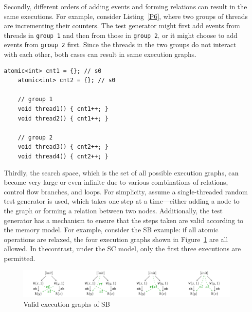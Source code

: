 Secondly, different orders of adding events and forming relations can result in the same executions. For example, consider Listing~\ref{P6}, where two groups of threads are incrementing their counters. The test generator might first add events from threads in \texttt{group 1} and then from those in \texttt{group 2}, or it might choose to add events from \texttt{group 2} first. Since the threads in the two groups do not interact with each other, both cases can result in same execution graphs.


\begin{lstlisting}[caption={P6}, label={P6}]
    atomic<int> cnt1 = {}; // s0
    atomic<int> cnt2 = {}; // s0
    
    // group 1
    void thread1() { cnt1++; }
    void thread2() { cnt1++; }

    // group 2
    void thread3() { cnt2++; }
    void thread4() { cnt2++; }

\end{lstlisting}


Thirdly, the search space, which is the set of all possible execution graphs, can become very large or even infinite due to various combinations of relations, control flow branches, and loops. For simplicity, assume a single-threaded random test generator is used, which takes one step at a time—either adding a node to the graph or forming a relation between two nodes. Additionally, the test generator has a mechanism to ensure that the steps taken are valid according to the memory model. For example, consider the SB example: if all atomic operations are relaxed, the four execution graphs shown in Figure~\ref{SB4} are all allowed. In thecontrast, under the SC model, only the first three executions are permitted.


\begin{figure}[h!tbp]  
    \centering
    \includegraphics[scale=0.8]{figure/exec-graph/SB4.pdf}   
    \caption{Valid execution graphs of SB}  
    \label{SB4}  
\end{figure}








